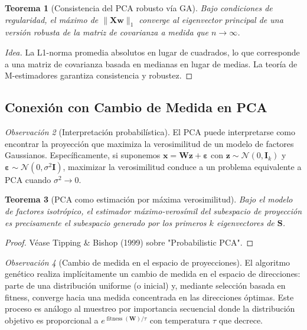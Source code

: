\documentclass[11pt,a4paper]{article}
\theoremstyle{plain}
\newtheorem{theorem}{Teorema}[section]
\theoremstyle{definition}
\theoremstyle{remark}
\newtheorem{remark}[theorem]{Observación}
\newcommand{\1}{\mathbf{1}}
\begin{document}
\begin{theorem}[Consistencia del PCA robusto vía GA]
\label{thm:robust_pca_consistency}
Bajo condiciones de regularidad, el máximo de $\|\mathbf{X} \mathbf{w}\|_1$ converge al eigenvector principal de una versión robusta de la matriz de covarianza a medida que $n \to \infty$.
\end{theorem}

\begin{proof}[Idea]
La L1-norma promedia absolutos en lugar de cuadrados, lo que corresponde a una matriz de covarianza basada en medianas en lugar de medias. La teoría de M-estimadores garantiza consistencia y robustez.
\end{proof}

\subsection{Conexión con Cambio de Medida en PCA}

\begin{remark}[Interpretación probabilística]
El PCA puede interpretarse como encontrar la proyección que maximiza la verosimilitud de un modelo de factores Gaussianos. Específicamente, si suponemos $\mathbf{x} = \mathbf{W} \mathbf{z} + \boldsymbol{\varepsilon}$ con $\mathbf{z} \sim \mathcal{N}(0,\mathbf{I}_k)$ y $\boldsymbol{\varepsilon} \sim \mathcal{N}(0,\sigma^2 \mathbf{I})$, maximizar la verosimilitud conduce a un problema equivalente a PCA cuando $\sigma^2 \to 0$.
\end{remark}

\begin{theorem}[PCA como estimación por máxima verosimilitud]
\label{thm:pca_mle}
Bajo el modelo de factores isotrópico, el estimador máximo-verosímil del subespacio de proyección es precisamente el subespacio generado por los primeros $k$ eigenvectores de $\mathbf{S}$.
\end{theorem}

\begin{proof}
Véase Tipping \& Bishop (1999) sobre "Probabilistic PCA".
\end{proof}

\begin{remark}[Cambio de medida en el espacio de proyecciones]
El algoritmo genético realiza implícitamente un cambio de medida en el espacio de direcciones: parte de una distribución uniforme (o inicial) y, mediante selección basada en fitness, converge hacia una medida concentrada en las direcciones óptimas. Este proceso es análogo al muestreo por importancia secuencial donde la distribución objetivo es proporcional a $e^{\operatorname{fitness}(\mathbf{W})/\tau}$ con temperatura $\tau$ que decrece.
\end{remark}
\end{document}
